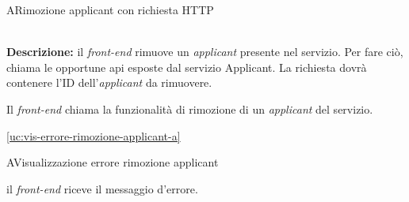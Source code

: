 \begin{usecase}{13}{A}{Rimozione applicant con richiesta HTTP}


	\textbf{\\Descrizione:} il \textit{front-end} rimuove un \textit{applicant} presente nel servizio. Per fare ciò,
	chiama le opportune \acrshort{api} esposte dal servizio Applicant. La richiesta dovrà contenere l'ID dell'\textit{applicant} da rimuovere.

	\begin{ucscenarioprincipale}
		\item Il \textit{front-end} chiama la funzionalità di rimozione di un \textit{applicant} del servizio.
	\end{ucscenarioprincipale}


	\begin{ucestensioni}
		\item \ref{uc:vis-errore-rimozione-applicant-a}
	\end{ucestensioni}

	\label{uc:richiesta-rimozione-applicant-a}
\end{usecase}

\begin{usecase}{14}{A}{Visualizzazione errore rimozione applicant}



	\begin{ucscenarioprincipale}
		\item il \textit{front-end} riceve il messaggio d'errore.
	\end{ucscenarioprincipale}


	\label{uc:vis-errore-rimozione-applicant-a}
\end{usecase}



\clearpage


